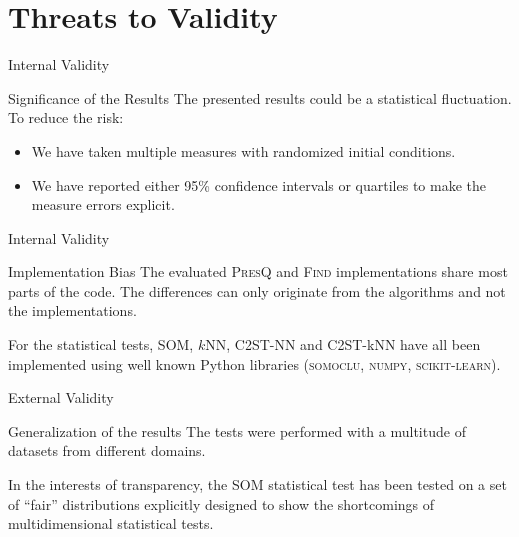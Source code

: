 \documentclass[10pt]{beamer}
\newcommand{\PresQ}[0]{\textsc{PresQ}\xspace}
\begin{document}
\section{Threats to Validity}

\begin{frame}{Internal Validity}
    \begin{alertblock}{Significance of the Results}
        \smallskip
        The presented results could be a statistical fluctuation. To reduce the risk:
        
        \begin{itemize}
            \item We have taken multiple measures with randomized initial conditions.
            \item We have reported either 95\% confidence intervals or quartiles to make the measure errors explicit.
        \end{itemize}
    \end{alertblock}
\end{frame}

\begin{frame}{Internal Validity}
    \begin{alertblock}{Implementation Bias}
        \smallskip
        The evaluated \PresQ and \textsc{Find} implementations share most parts of the code. The differences can only originate
        from the algorithms and not the implementations.
        
        \smallskip
        
        For the statistical tests, SOM, $k$NN, C2ST-NN and C2ST-kNN have all been implemented using well known
        Python libraries (\textsc{somoclu}, \textsc{numpy}, \textsc{scikit-learn}).
    \end{alertblock}
\end{frame}

\begin{frame}{External Validity}
    \begin{alertblock}{Generalization of the results}
        \smallskip
        The tests were performed with a multitude of datasets from different domains.
        
        \smallskip

        In the interests of transparency, the SOM statistical test has been tested on a set
        of ``fair'' distributions explicitly designed to show the shortcomings of multidimensional statistical tests.
        
    \end{alertblock}
\end{frame}
\end{document}
